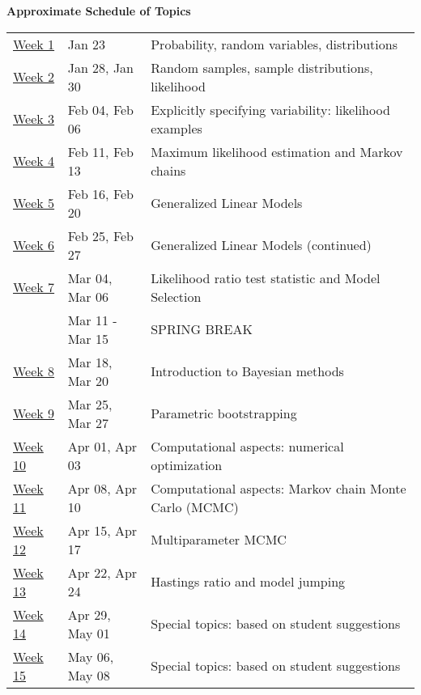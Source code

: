 \documentclass[11pt]{article}
\begin{document}
{\bf Approximate Schedule of Topics}\\
\begin{table}[htp]
\begin{center}
\begin{tabular}{|ll|p{4in}|}
\hline
\underline{Week 1} &  Jan 23 & Probability, random variables, distributions  \\
\underline{Week 2} &  Jan 28, Jan 30 & Random samples, sample distributions, likelihood  \\
\underline{Week 3} &  Feb 04, Feb 06 & Explicitly specifying variability:  likelihood examples \\
\underline{Week 4} &  Feb 11, Feb 13 & Maximum likelihood estimation and Markov chains\\
\underline{Week 5} &  Feb 16, Feb 20 & Generalized Linear Models  \\
\underline{Week 6} &  Feb 25, Feb 27 & Generalized Linear Models (continued) \\
\underline{Week 7} &  Mar 04, Mar 06 & Likelihood ratio test statistic and Model Selection\\
& Mar 11 - Mar 15 & SPRING BREAK \\
\underline{Week 8} &  Mar 18, Mar 20 & Introduction to Bayesian methods\\
\underline{Week 9} &  Mar 25, Mar 27  & Parametric bootstrapping \\
\underline{Week 10} & Apr 01, Apr 03 & Computational aspects: numerical optimization \\
\underline{Week 11} & Apr 08, Apr 10  &  Computational  aspects: Markov chain Monte Carlo (MCMC)\\
\underline{Week 12} & Apr 15, Apr 17  &  Multiparameter  MCMC \\
\underline{Week 13} & Apr 22, Apr 24  &  Hastings ratio and model jumping \\
\underline{Week 14} & Apr 29, May 01  &  Special topics: based on student suggestions\\
\underline{Week 15} & May 06, May 08  &  Special topics: based on student suggestions \\
\hline
\end{tabular}
\end{center}
\label{default}
\end{table}%
\end{document}
